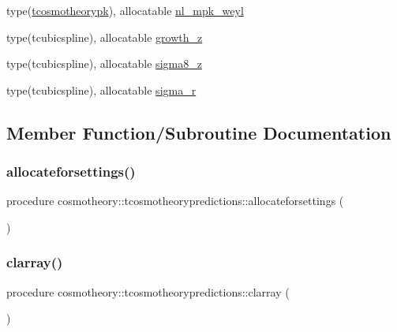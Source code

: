 \begin{DoxyCompactItemize}
\item 
type(\mbox{\hyperlink{structcosmotheory_1_1tcosmotheorypk}{tcosmotheorypk}}), allocatable \mbox{\hyperlink{structcosmotheory_1_1tcosmotheorypredictions_a872cce3b3a9c067fc9255db5ed740b21}{nl\+\_\+mpk\+\_\+weyl}}
\item 
type(tcubicspline), allocatable \mbox{\hyperlink{structcosmotheory_1_1tcosmotheorypredictions_a66fb93dd5c11340e09f62caf1f3ba0f3}{growth\+\_\+z}}
\item 
type(tcubicspline), allocatable \mbox{\hyperlink{structcosmotheory_1_1tcosmotheorypredictions_a2025959291430a32b4e0fe6daae63fb3}{sigma8\+\_\+z}}
\item 
type(tcubicspline), allocatable \mbox{\hyperlink{structcosmotheory_1_1tcosmotheorypredictions_ad61d7303d799b85ff75808a69708c7ac}{sigma\+\_\+r}}
\end{DoxyCompactItemize}


\subsection{Member Function/\+Subroutine Documentation}
\mbox{\label{structcosmotheory_1_1tcosmotheorypredictions_a626a5dcd9f981234534db43ae45b8fb1}} 
\subsubsection{\texorpdfstring{allocateforsettings()}{allocateforsettings()}}
{\footnotesize\ttfamily procedure cosmotheory\+::tcosmotheorypredictions\+::allocateforsettings (\begin{DoxyParamCaption}{ }\end{DoxyParamCaption})\hspace{0.3cm}{\ttfamily [private]}}

\mbox{\label{structcosmotheory_1_1tcosmotheorypredictions_a29c34b6cc7598a2837c774bef24fad0d}} 
\subsubsection{\texorpdfstring{clarray()}{clarray()}}
{\footnotesize\ttfamily procedure cosmotheory\+::tcosmotheorypredictions\+::clarray (\begin{DoxyParamCaption}{ }\end{DoxyParamCaption})\hspace{0.3cm}{\ttfamily [private]}}

